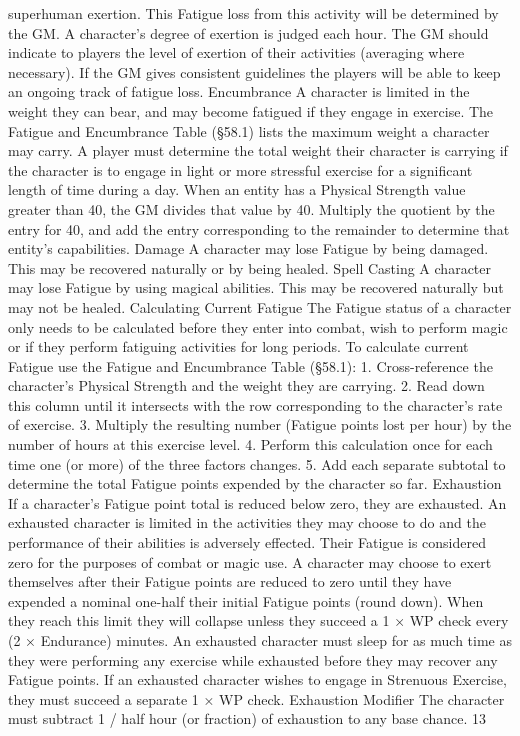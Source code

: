 \documentclass[a4paper]{article}
\begin{document}
\begin{multicols}{3}
superhuman exertion. This Fatigue loss from this
activity will be determined by the GM.
A character’s degree of exertion is judged each
hour.
The GM should indicate to players the level of
exertion of their activities (averaging where necessary). If the GM gives consistent guidelines the
players will be able to keep an ongoing track of
fatigue loss.
Encumbrance
A character is limited in the weight they can bear,
and may become fatigued if they engage in exercise.
The Fatigue and Encumbrance Table (§58.1) lists
the maximum weight a character may carry.
A player must determine the total weight their
character is carrying if the character is to engage in
light or more stressful exercise for a significant
length of time during a day.
When an entity has a Physical Strength value
greater than 40, the GM divides that value by 40.
Multiply the quotient by the entry for 40, and add
the entry corresponding to the remainder to determine that entity’s capabilities.
Damage
A character may lose Fatigue by being damaged.
This may be recovered naturally or by being
healed.
Spell Casting
A character may lose Fatigue by using magical
abilities. This may be recovered naturally but may
not be healed.
Calculating Current Fatigue
The Fatigue status of a character only needs to be
calculated before they enter into combat, wish to
perform magic or if they perform fatiguing activities for long periods. To calculate current Fatigue
use the Fatigue and Encumbrance Table (§58.1):
1. Cross-reference the character’s Physical
Strength and the weight they are carrying.
2. Read down this column until it intersects with
the row corresponding to the character’s rate of
exercise.
3. Multiply the resulting number (Fatigue points
lost per hour) by the number of hours at this exercise level.
4. Perform this calculation once for each time one
(or more) of the three factors changes.
5. Add each separate subtotal to determine the total
Fatigue points expended by the character so far.
Exhaustion
If a character’s Fatigue point total is reduced below
zero, they are exhausted. An exhausted character is
limited in the activities they may choose to do and
the performance of their abilities is adversely effected. Their Fatigue is considered zero for the
purposes of combat or magic use.
A character may choose to exert themselves after
their Fatigue points are reduced to zero until they
have expended a nominal one-half their initial
Fatigue points (round down). When they reach this
limit they will collapse unless they succeed a 1 ×
WP check every (2 × Endurance) minutes.
An exhausted character must sleep for as much
time as they were performing any exercise while
exhausted before they may recover any Fatigue
points.
If an exhausted character wishes to engage in
Strenuous Exercise, they must succeed a separate 1
× WP check.
Exhaustion Modifier
The character must subtract 1 / half hour (or fraction) of exhaustion to any base chance.
13


\end{multicols}
\end{document}
